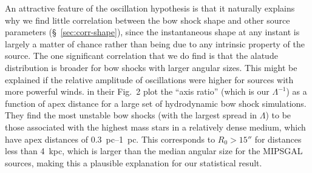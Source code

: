 An attractive feature of the oscillation hypothesis is that it
naturally explains why we find little correlation between the bow
shock shape and other source parameters (\S~\ref{sec:corr-shape}),
since the instantaneous shape at any instant is largely a matter of
chance rather than being due to any intrinsic property of the source.
The one significant correlation that we do find is that the alatude
distribution is broader for bow shocks with larger angular sizes.
This might be explained if the relative amplitude of oscillations were
higher for sources with more powerful winds. \citet{Meyer:2016a} in
their Fig.~2 plot the ``axis ratio'' (which is our \(\Lambda^{-1}\)) as a
function of apex distance for a large set of hydrodynamic bow shock
simulations.  They find the most unstable bow shocks (with the largest
spread in \(\Lambda\)) to be those associated with the highest mass stars in
a relatively dense medium, which have apex distances of
\SIrange{0.3}{1}{pc}.  This corresponds to \(R_0 > 15''\) for
distances less than \SI{4}{kpc}, which is larger than the median
angular size for the MIPSGAL sources, making this a plausible explanation for our statistical result.

